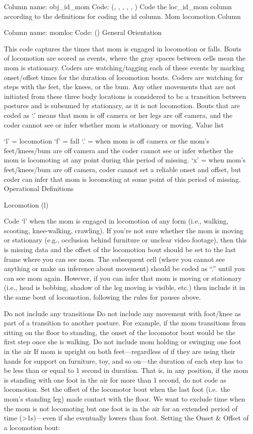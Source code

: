 \documentclass[
]{book}
\begin{document}
Column name: obj\_id\_mom
Code: (, , , , , )
Code the loc\_id\_mom column according to the definitions for coding the id column.
Mom locomotion Column

Column name: momloc
Code: ()
General Orientation

This code captures the times that mom is engaged in locomotion or falls. Bouts of locomotion are scored as events, where the gray spaces between cells mean the mom is stationary. Coders are watching/tagging each of these events by marking onset/offset times for the duration of locomotion bouts. Coders are watching for steps with the feet, the knees, or the bum. Any other movements that are not initiated from these three body locations is considered to be a transition between postures and is subsumed by stationary, as it is not locomotion. Bouts that are coded as `.' means that mom is off camera or her legs are off camera, and the coder cannot see or infer whether mom is stationary or moving.
Value list

`l' = locomotion
`f' = fall
`.' = when mom is off camera or the mom's feet/knees/bum are off camera and the coder cannot see or infer whether the mom is locomoting at any point during this period of missing.
`x' = when mom's feet/knees/bum are off camera, coder cannot set a reliable onset and offset, but coder can infer that mom is locomoting at some point of this period of missing.
Operational Definitions

Locomotion (l)

Code `l' when the mom is engaged in locomotion of any form (i.e., walking, scooting, knee-walking, crawling).
If you're not sure whether the mom is moving or stationary (e.g., occlusion behind furniture or unclear video footage), then this is missing data and the offset of the locomotion bout should be set to the last frame where you can see mom.
The subsequent cell (where you cannot see anything or make an inference about movement) should be coded as ``.'' until you can see mom again.
However, if you can infer that mom is moving or stationary (i.e., head is bobbing, shadow of the leg moving is visible, etc.) then include it in the same bout of locomotion, following the rules for pauses above.

Do not include any transitions
Do not include any movement with foot/knee as part of a transition to another posture. For example, if the mom transitions from sitting on the floor to standing, the onset of the locomotor bout would be the first step once she is walking.
Do not include mom holding or swinging one foot in the air
If mom is upright on both feet---regardless of if they are using their hands for support on furniture, toy, and so on---the duration of each step has to be less than or equal to 1 second in duration. That is, in any position, if the mom is standing with one foot in the air for more than 1 second, do not code as locomotion. Set the offset of the locomotor bout when the last foot (i.e.~the mom's standing leg) made contact with the floor. We want to exclude time when the mom is not locomoting but one foot is in the air for an extended period of time (\textgreater1s)---even if she eventually lowers than foot.
Setting the Onset \& Offset of a locomotion bout:
\end{document}
